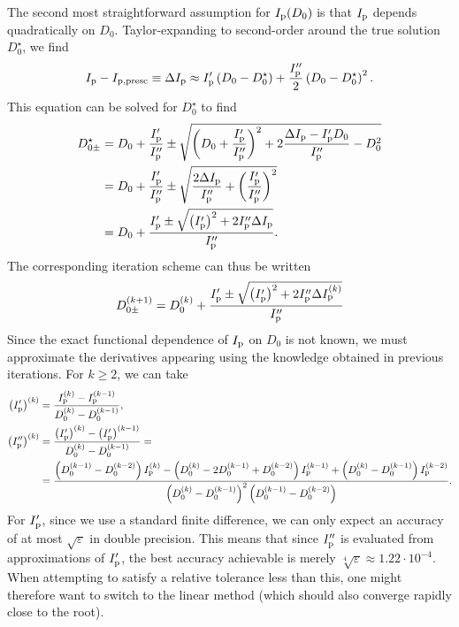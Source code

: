 \documentclass{notes}
\begin{document}
	The second most straightforward assumption for $I_{\rm p}(D_0)$ is that
	$I_{\rm p}$ depends quadratically on $D_0$. Taylor-expanding to second-order
	around the true solution $D_0^\star$, we find
	\begin{equation}
		I_{\rm p} - I_{\rm p,presc} \equiv \Delta I_{\rm p} \approx
			I_{\rm p}'\left(D_0-D_0^\star\right) +
			\frac{I_{\rm p}''}{2}\left(D_0-D_0^\star\right)^2.
	\end{equation}
	This equation can be solved for $D_0^\star$ to find
	\begin{equation}
		\begin{aligned}
			D_{0\pm}^\star &= D_0 + \frac{I_{\rm p}'}{I_{\rm p}''} \pm
				\sqrt{
					\left(D_0+\frac{I_{\rm p}'}{I_{\rm p}''}\right)^2
					+2\frac{\Delta I_{\rm p} - I_{\rm p}'D_0}{I_{\rm p}''}-D_0^2
				}
				\\
				&=
				D_0 + \frac{I_{\rm p}'}{I_{\rm p}''} \pm
				\sqrt{
					\frac{2\Delta I_{\rm p}}{I_{\rm p}''} +
					\left(\frac{I_{\rm p}'}{I_{\rm p}''}\right)^2
				}
				\\
				&=
				D_0 + \frac{I_{\rm p}'\pm
				\sqrt{
					\left(I_{\rm p}'\right)^2+2I_{\rm p}''\Delta I_{\rm p}
				}}{I_{\rm p}''}.
		\end{aligned}
	\end{equation}
	The corresponding iteration scheme can thus be written
	\begin{equation}
		D_{0\pm}^{(k+1)} =
			D_0^{(k)} +
			\frac{I_{\rm p}' \pm
			\sqrt{
				\left(I_{\rm p}'\right)^2 +
				2I_{\rm p}''\Delta I_{\rm p}^{(k)}
			}}{I_{\rm p}''}
	\end{equation}
	Since the exact functional dependence of $I_{\rm p}$ on $D_0$ is not known,
	we must approximate the derivatives appearing using the knowledge obtained
	in previous iterations. For $k\geq 2$, we can take
	\begin{equation}
		\begin{aligned}
			\left(I_{\rm p}'\right)^{(k)} &= \frac{I_{\rm p}^{(k)}-I_{\rm p}^{(k-1)}}{D_0^{(k)}-D_0^{(k-1)}},\\
			\left(I_{\rm p}''\right)^{(k)} &=
				\frac{\left(I_{\rm p}'\right)^{(k)}-\left(I_{\rm p}'\right)^{(k-1)}}
					{D_0^{(k)}-D_0^{(k-1)}} =
				\\
				&=
				\frac{
					\left(D_0^{(k-1)}-D_0^{(k-2)}\right)I_{\rm p}^{(k)}
					-\left(D_0^{(k)}-2D_0^{(k-1)}+D_0^{(k-2)}\right)I_{\rm p}^{(k-1)}
					+\left(D_0^{(k)}-D_0^{(k-1)}\right)I_{\rm p}^{(k-2)}
				}
				{\left(D_0^{(k)}-D_0^{(k-1)}\right)^2\left(D_0^{(k-1)}-D_0^{(k-2)}\right)}
				.
		\end{aligned}
	\end{equation}
	For $I_{\rm p}'$, since we use a standard finite difference, we can only
	expect an accuracy of at most $\sqrt{\varepsilon}$ in double precision. This
	means that since $I_{\rm p}''$ is evaluated from approximations of
	$I_{\rm p}'$, the best accuracy achievable is merely
	$\sqrt[4]{\varepsilon}\approx 1.22\cdot 10^{-4}$. When attempting to satisfy
	a relative tolerance less than this, one might therefore want to switch to
	the linear method (which should also converge rapidly close to the root).
\end{document}
